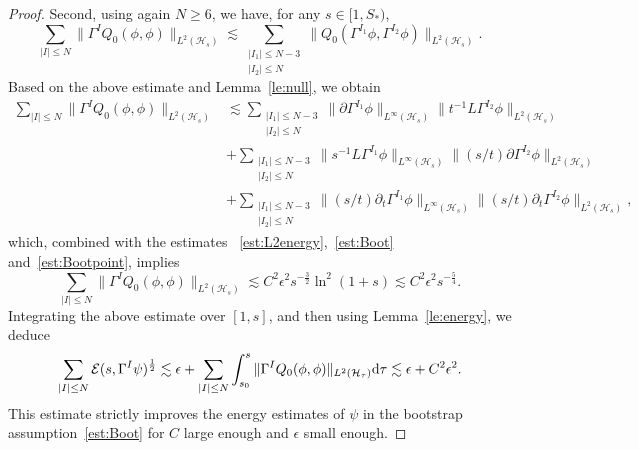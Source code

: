 \documentclass[a4paper,reqno]{amsart}
\theoremstyle{definition}
\numberwithin{equation}{section}
\def \d {{\rm{d}}}
\begin{document}
\begin{proof}
\smallskip
Second, using again $N\ge 6$, we have, for any $s\in [1,S_{*})$,  
\begin{equation*}
     \sum_{|I|\le N}\|\Gamma^{I}Q_{0}(\phi,\phi)\|_{L^{2}(\mathcal{H}_{s})}
    \lesssim \sum_{\substack{|I_{1}|\le N-3\\ |I_{2}|\le N}}
    \|Q_{0}(\Gamma^{I_{1}}\phi,\Gamma^{I_{2}}\phi)\|_{L^{2}(\mathcal{H}_{s})}.
\end{equation*}
Based on the above estimate and Lemma~\ref{le:null}, we obtain 
\begin{equation*}
\begin{aligned}
     \sum_{|I|\le N}\|\Gamma^{I}Q_{0}(\phi,\phi)\|_{L^{2}(\mathcal{H}_{s})}
    &\lesssim \sum_{\substack{|I_{1}|\le N-3\\ |I_{2}|\le N}}
    \|\partial \Gamma^{I_{1}}\phi\|_{L^{\infty}(\mathcal{H}_{s})}
    \|t^{-1}L\Gamma^{I_{2}}\phi\|_{L^{2}(\mathcal{H}_{s})}\\
    &+\sum_{\substack{|I_{1}|\le N-3\\ |I_{2}|\le N}}
    \|s^{-1}L\Gamma^{I_{1}}\phi\|_{L^{\infty}(\mathcal{H}_{s})}
    \|(s/t)\partial \Gamma^{I_{2}}\phi\|_{L^{2}(\mathcal{H}_{s})}\\
    &+\sum_{\substack{|I_{1}|\le N-3\\ |I_{2}|\le N}}
    \|(s/t)\partial_{t}\Gamma^{I_{1}}\phi\|_{L^{\infty}(\mathcal{H}_{s})}\|(s/t)\partial_{t}\Gamma^{I_{2}}\phi\|_{L^{2}(\mathcal{H}_{s})},
\end{aligned}
\end{equation*}
which, combined with the estimates ~\eqref{est:L2energy},~\eqref{est:Boot} and~\eqref{est:Bootpoint}, implies
\begin{equation*}
    \sum_{|I|\le N}\|\Gamma^{I}Q_{0}(\phi,\phi)\|_{L^{2}(\mathcal{H}_{s})}\lesssim C^{2}\epsilon^{2}s^{-\frac{3}{2}}
    \ln^{2} (1+s)\lesssim C^{2}\epsilon^{2}s^{-\frac{5}{4}}.
\end{equation*}
Integrating the above estimate over $[1,s]$, and then using Lemma~\ref{le:energy}, we deduce
\begin{equation*}
    \sum_{|I|\le N}\mathcal{E}(s,\Gamma^{I}\psi)^{\frac{1}{2}}
    \lesssim  \epsilon
    +\sum_{|I|\le N}\int_{s_{0}}^{s}\|\Gamma^{I}Q_{0}(\phi,\phi)\|_{L^{2}(\mathcal{H}_{\tau})}\d \tau
    \lesssim
    \epsilon+C^{2}\epsilon^{2}.
\end{equation*}
This estimate strictly improves the energy estimates of $\psi$ in the bootstrap assumption~\eqref{est:Boot} for  $C$ large enough and $\epsilon$ small enough.


\end{proof}
\end{document}
